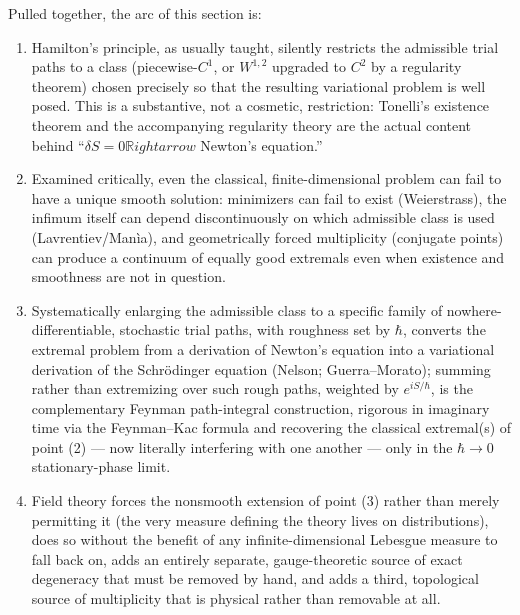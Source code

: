 Pulled together, the arc of this section is:
\begin{enumerate}
\item Hamilton's principle, as usually taught, silently restricts the
    admissible trial paths to a class (piecewise-$C^1$, or $W^{1,2}$ upgraded
        to $C^2$ by a regularity theorem) chosen precisely so that the
        resulting variational problem is well posed. This is a substantive, not
        a cosmetic, restriction: Tonelli's existence theorem and the
        accompanying regularity theory are the actual content behind ``$\delta
        S=0 \mathbb{R}ightarrow$ Newton's equation.''
\item Examined critically, even the classical, finite-dimensional problem can
    fail to have a unique smooth solution: minimizers can fail to exist
        (Weierstrass), the infimum itself can depend discontinuously on which
        admissible class is used (Lavrentiev/Man\`ia), and geometrically forced
        multiplicity (conjugate points) can produce a continuum of equally good
        extremals even when existence and smoothness are not in question.
\item Systematically enlarging the admissible class to a specific family of
    nowhere-differentiable, stochastic trial paths, with roughness set by
        $\hbar$, converts the extremal problem from a derivation of Newton's
        equation into a variational derivation of the Schr\"odinger equation
        (Nelson; Guerra--Morato); summing rather than extremizing over such
        rough paths, weighted by $e^{iS/\hbar}$, is the complementary Feynman
        path-integral construction, rigorous in imaginary time via the
        Feynman--Kac formula and recovering the classical extremal(s) of point
        (2) --- now literally interfering with one another --- only in the
        $\hbar\to0$ stationary-phase limit.
\item Field theory forces the nonsmooth extension of point (3) rather than
    merely permitting it (the very measure defining the theory lives on
        distributions), does so without the benefit of any infinite-dimensional
        Lebesgue measure to fall back on, adds an entirely separate,
        gauge-theoretic source of exact degeneracy that must be removed by
        hand, and adds a third, topological source of multiplicity that is
        physical rather than removable at all.
\end{enumerate}

